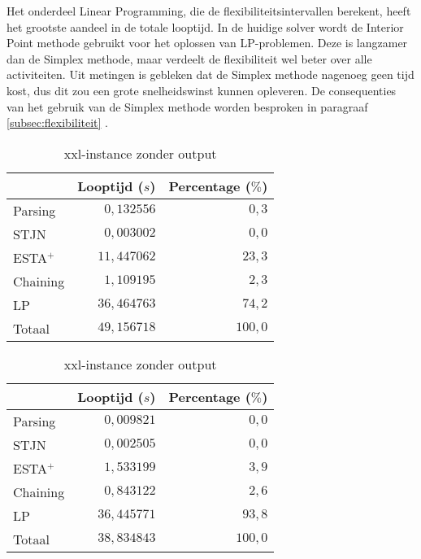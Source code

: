 Het onderdeel Linear Programming, die de flexibiliteitsintervallen berekent, heeft het grootste aandeel in de totale looptijd. In de huidige solver wordt de Interior Point methode gebruikt voor het oplossen van LP-problemen. Deze is langzamer dan de Simplex methode, maar verdeelt de flexibiliteit wel beter over alle activiteiten. Uit metingen is gebleken dat de Simplex methode nagenoeg geen tijd kost, dus dit zou een grote snelheidswinst kunnen opleveren. De consequenties van het gebruik van de Simplex methode worden besproken in paragraaf \ref{subsec:flexibiliteit} .

\begin{table}[H]
\parbox{.45\linewidth}{
    \centering
    \begin{tabular}{| l | r | r |}
        \hline
                    & Looptijd ($s$)  & Percentage ($\%$) \\
        \hline
        Parsing     &  $0,132556$     & $0,3$   \\
        STJN        &  $0,003002$     & $0,0$   \\
        ESTA$^+$    & $11,447062$     & $23,3$  \\
        Chaining    &  $1,109195$     & $2,3$   \\
        LP          & $36,464763$     & $74,2$  \\
        \hline \hline
        Totaal      & $49,156718$     & $100,0$ \\
        \hline
    \end{tabular}
    \caption{xxl-instance met output}
    \label{tbl:xxl+output}
}
\hfill
\parbox{.45\linewidth}{
    \centering
    \begin{tabular}{| l | r | r |}
        \hline
                    & Looptijd ($s$)& Percentage ($\%$) \\
        \hline
        Parsing     &  $0,009821$      &  $0,0$  \\
        STJN        &  $0,002505$      &  $0,0$  \\
        ESTA$^+$    &  $1,533199$      &  $3,9$  \\
        Chaining    &  $0,843122$      &  $2,6$  \\
        LP          & $36,445771$      & $93,8$  \\
        \hline \hline
        Totaal      & $38,834843$      & $100,0$ \\
        \hline
    \end{tabular}
    \caption{xxl-instance zonder output}
    \label{tbl:xxl-output}
}
\end{table}

